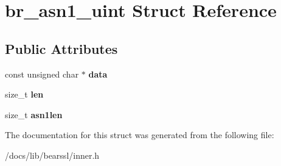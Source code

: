 \hypertarget{structbr__asn1__uint}{}\section{br\+\_\+asn1\+\_\+uint Struct Reference}
\label{structbr__asn1__uint}
\subsection*{Public Attributes}
\begin{DoxyCompactItemize}
\item 
\mbox{\label{structbr__asn1__uint_ade00cde8bd8bc528bd8e3396beaf473b}} 
const unsigned char $\ast$ {\bfseries data}
\item 
\mbox{\label{structbr__asn1__uint_a454b7dc6ee61934d28b5231c8a3fb5ed}} 
size\+\_\+t {\bfseries len}
\item 
\mbox{\label{structbr__asn1__uint_a2fe28c59f37721265ca98014ebb1c6d5}} 
size\+\_\+t {\bfseries asn1len}
\end{DoxyCompactItemize}


The documentation for this struct was generated from the following file\+:\begin{DoxyCompactItemize}
\item 
/docs/lib/bearssl/inner.\+h\end{DoxyCompactItemize}
